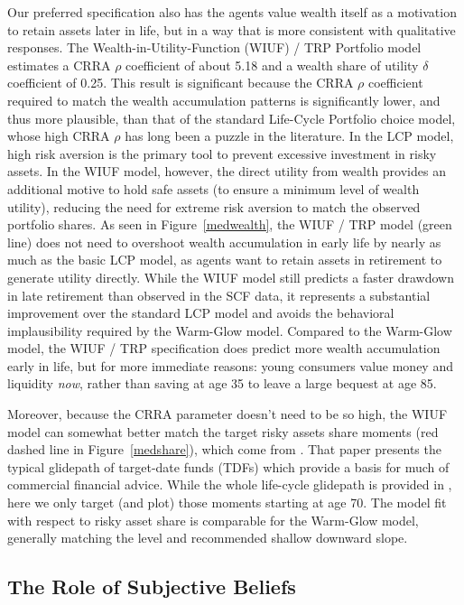 \documentclass{article}
\newcommand{\CRRA}{\rho}
\begin{document}
Our preferred specification also has the agents value wealth itself as a motivation to retain assets later in life, but in a way that is more consistent with qualitative responses.
The Wealth-in-Utility-Function (WIUF) / TRP Portfolio model estimates a CRRA $\CRRA$ coefficient of about 5.18 and a wealth share of utility $\delta$ coefficient of 0.25.
This result is significant because the CRRA $\CRRA$ coefficient required to match the wealth accumulation patterns is significantly lower, and thus more plausible, than that of the standard Life-Cycle Portfolio choice model, whose high CRRA $\CRRA$ has long been a puzzle in the literature. In the LCP model, high risk aversion is the primary tool to prevent excessive investment in risky assets. In the WIUF model, however, the direct utility from wealth provides an additional motive to hold safe assets (to ensure a minimum level of wealth utility), reducing the need for extreme risk aversion to match the observed portfolio shares.
As seen in Figure~\ref{medwealth}, the WIUF / TRP model (green line) does not need to overshoot wealth accumulation in early life by nearly as much as the basic LCP model, as agents want to retain assets in retirement to generate utility directly. While the WIUF model still predicts a faster drawdown in late retirement than observed in the SCF data, it represents a substantial improvement over the standard LCP model and avoids the behavioral implausibility required by the Warm-Glow model.
Compared to the Warm-Glow model, the WIUF / TRP specification does predict more wealth accumulation early in life, but for more immediate reasons: young consumers value money and liquidity \textit{now}, rather than saving at age 35 to leave a large bequest at age 85.

Moreover, because the CRRA parameter doesn't need to be so high, the WIUF model can somewhat better match the target risky assets share moments (red dashed line in Figure~\ref{medshare}), which come from \cite{Aboagye2024}.
That paper presents the typical glidepath of target-date funds (TDFs) which provide a basis for much of commercial financial advice.
While the whole life-cycle glidepath is provided in \cite{Aboagye2024}, here we only target (and plot) those moments starting at age 70.
The model fit with respect to risky asset share is comparable for the Warm-Glow model, generally matching the level and recommended shallow downward slope.

\subsection{The Role of Subjective Beliefs}
\end{document}
